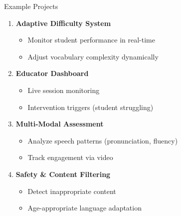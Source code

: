 \documentclass[aspectratio=169]{beamer}
\begin{document}
\begin{frame}{Example Projects}
\begin{enumerate}
    \item \textbf{Adaptive Difficulty System}
    \begin{itemize}
        \item Monitor student performance in real-time
        \item Adjust vocabulary complexity dynamically
    \end{itemize}

    \vspace{0.2cm}

    \item \textbf{Educator Dashboard}
    \begin{itemize}
        \item Live session monitoring
        \item Intervention triggers (student struggling)
    \end{itemize}

    \vspace{0.2cm}

    \item \textbf{Multi-Modal Assessment}
    \begin{itemize}
        \item Analyze speech patterns (pronunciation, fluency)
        \item Track engagement via video
    \end{itemize}
    
    \vspace{0.2cm}

    \item \textbf{Safety \& Content Filtering}
    \begin{itemize}
        \item Detect inappropriate content
        \item Age-appropriate language adaptation
    \end{itemize}
\end{enumerate}
\end{frame}
\end{document}
